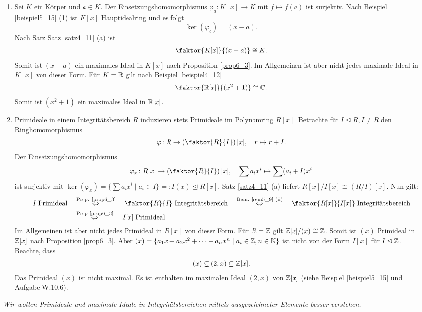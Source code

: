 \begin{beispiel}\label{beispiel6_5}
	\begin{enumerate}[label=(\arabic*)]
		\item Sei $K$ ein Körper und $a \in K$. Der Einsetzungshomomorphismus $\varphi_a \colon K[x] \to K$ mit $f \mapsto f(a)$ ist surjektiv. Nach Beispiel \ref{beispiel5_15} (1) ist $K[x]$ Hauptidealring und es folgt
		\[\ker(\varphi_a) = (x-a).\]
		Nach Satz Satz \ref{satz4_11} (a) ist
		\[\faktor{K[x]}{(x-a)} \cong K.\]
		Somit ist $(x-a)$ ein maximales Ideal in $K[x]$ nach Proposition \ref{prop6_3}. Im Allgemeinen ist aber nicht jedes maximale Ideal in $K[x]$ von dieser Form. Für $K = \mathbb{R}$ gilt nach Beispiel \ref{beispiel4_12} 
		\[\faktor{\R[x]}{(x^2 + 1)} \cong \C.\]
		Somit ist $(x^2 + 1)$ ein maximales Ideal in $\mathbb{R}[x]$.
		\item Primideale in einem Integritätsbereich $R$ induzieren stets Primideale im Polynomring $R[x]$. Betrachte für $I \unlhd R, I \neq R$ den Ringhomomorphismus
		\[\varphi \colon R \to \left(\faktor{R}{I}\right)[x],\quad r \mapsto r + I.\]
		Der Einsetzungshomomorphismus
		\[\varphi_x \colon R[x] \to \left(\faktor{R}{I}\right)[x], \quad \sum a_i x^i \mapsto \sum (a_i + I) x^i\]
		ist surjektiv mit $\ker(\varphi_x) = \{\sum a_i x^i \mid a_i \in I\} =: I(x) \unlhd R[x]$. Satz \ref{satz4_11} (a) liefert $R[x] / I[x] \cong (R/I)[x]$. Nun gilt:
		\begin{align*}I \;\text{Primideal}  \quad&\overset{\text{Prop. \ref{prop6_3}}}{\Leftrightarrow}\quad \faktor{R}{I} \text{ Integritätsbereich} \quad\overset{\text{Bem. \ref{rem5_9} (ii)}}{\Leftrightarrow}\quad \faktor{R[x]}{I[x]} \; \text{Integritätsbereich}\\
	  &\overset{\text{Prop \ref{prop6_3}}}{\Leftrightarrow}\quad I[x] \; \text{Primideal}.\end{align*}		
		Im Allgemeinen ist aber nicht jedes Primideal in $R[x]$ von dieser Form. Für $R=\mathbb{Z}$ gilt $\mathbb{Z}[x] / (x) \cong \mathbb{Z}$. Somit ist $(x)$ Primideal in $\mathbb{Z}[x]$ nach Proposition \ref{prop6_3}. Aber $(x) = \{a_1 x + a_2 x^2 + \dots + a_n x^n \mid a_i \in \mathbb{Z}, n \in \mathbb{N}\}$ ist nicht von der Form $I[x]$ für $I \unlhd \mathbb{Z}$. Beachte, dass 
		\begin{align*}
			(x) \subsetneq (2,x) \subsetneq \mathbb{Z}[x].
		\end{align*}
		Das Primideal $(x)$ ist nicht maximal. Es ist enthalten im maximalen Ideal $(2,x)$ von $\mathbb{Z}[x]$ (siehe Beispiel \ref{beispiel5_15} und Aufgabe W.10.6).
 	\end{enumerate} 
\end{beispiel}
\begin{leftbar}
	\textit{Wir wollen Primideale und maximale Ideale in Integritätsbereichen mittels ausgezeichneter Elemente besser verstehen.}
\end{leftbar}



